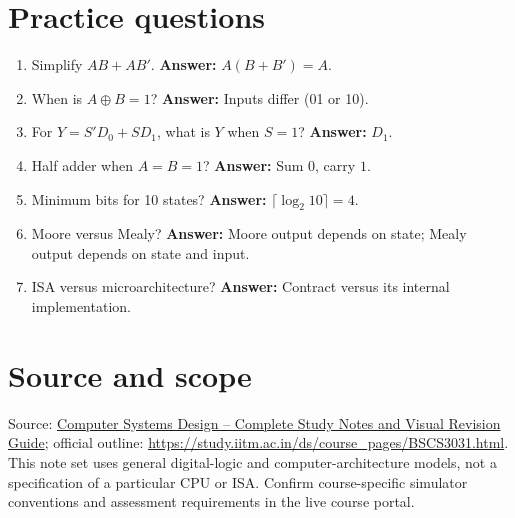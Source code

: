 \documentclass[11pt,a4paper]{article}
\begin{document}
\section{Practice questions}
\begin{enumerate}
\item Simplify $AB+AB'$. \textbf{Answer:} $A(B+B')=A$.
\item When is $A\oplus B=1$? \textbf{Answer:} Inputs differ (01 or 10).
\item For $Y=S'D_0+SD_1$, what is $Y$ when $S=1$? \textbf{Answer:} $D_1$.
\item Half adder when $A=B=1$? \textbf{Answer:} Sum $0$, carry $1$.
\item Minimum bits for 10 states? \textbf{Answer:} $\lceil\log_2 10\rceil=4$.
\item Moore versus Mealy? \textbf{Answer:} Moore output depends on state; Mealy output depends on state and input.
\item ISA versus microarchitecture? \textbf{Answer:} Contract versus its internal implementation.
\end{enumerate}
\section{Source and scope}
Source: \href{https://app.notion.com/p/403a8fc810f681798376c08924a7ca1b}{Computer Systems Design -- Complete Study Notes and Visual Revision Guide}; official outline: \url{https://study.iitm.ac.in/ds/course_pages/BSCS3031.html}. This note set uses general digital-logic and computer-architecture models, not a specification of a particular CPU or ISA. Confirm course-specific simulator conventions and assessment requirements in the live course portal.
\end{document}
